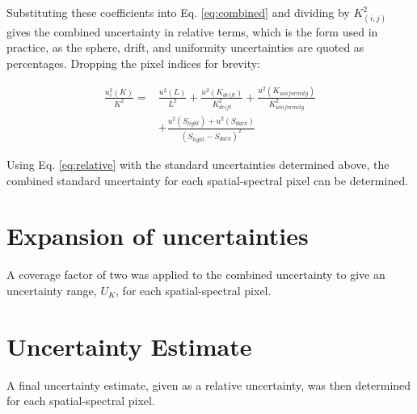 \documentclass[nohyper,nobib]{tufte-book}
\begin{document}
Substituting these coefficients into Eq. \ref{eq:combined} and dividing by $K_{(i,j)}^{2}$ gives the combined uncertainty in relative terms, which is the form used in practice, as the sphere, drift, and uniformity uncertainties are quoted as percentages. Dropping the pixel indices for brevity:

\begin{equation}
\label{eq:relative}
\begin{aligned}
\frac{u_{c}^{2}(K)}{K^{2}} = {} & \frac{u^{2}(L)}{L^{2}} + \frac{u^{2}(K_{drift})}{K_{drift}^{2}} + \frac{u^{2}(K_{uniformity})}{K_{uniformity}^{2}} \\
& + \frac{u^{2}(S_{light}) + u^{2}(S_{dark})}{\left(S_{light} - S_{dark}\right)^{2}}
\end{aligned}
\end{equation}

Using Eq. \ref{eq:relative} with the standard uncertainties determined above, the combined standard uncertainty for each spatial-spectral pixel can be determined.

\section{Expansion of uncertainties}
A coverage factor of two was applied to the combined uncertainty to give an uncertainty range, $U_{K}$, for each spatial-spectral pixel. 

\section{Uncertainty Estimate}
A final uncertainty estimate, given as a relative uncertainty, was then determined for each spatial-spectral pixel. 


\backmatter

%
%


\printindex
\end{document}
